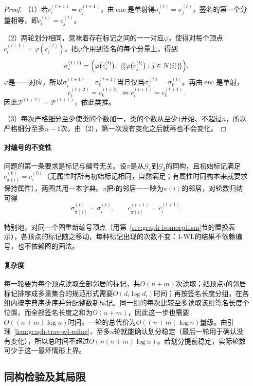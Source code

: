 \begin{proof}
（1）若$c_i^{(t+1)}=c_j^{(t+1)}$，由$\operatorname{enc}$是单射得$\sigma_i^{(t)}=\sigma_j^{(t)}$，签名的第一个分量相等，即$c_i^{(t)}=c_j^{(t)}$。

（2）两轮划分相同，意味着存在标记之间的一一对应$\varphi$，使得对每个顶点$c_i^{(t+1)}=\varphi(c_i^{(t)})$。把$\varphi$作用到签名的每个分量上，得到
\[
\sigma_i^{(t+1)}=\Bigl(\varphi\bigl(c_i^{(t)}\bigr),\ \{\!\{\varphi\bigl(c_j^{(t)}\bigr):j\in N(i)\}\!\}\Bigr).
\]
$\varphi$是一一对应，所以$\sigma_i^{(t+1)}=\sigma_k^{(t+1)}$当且仅当$\sigma_i^{(t)}=\sigma_k^{(t)}$。再由$\operatorname{enc}$是单射，
\[
c_i^{(t+2)}=c_k^{(t+2)}\iff c_i^{(t+1)}=c_k^{(t+1)}.
\]
因此$\mathcal P^{(t+2)}=\mathcal P^{(t+1)}$，依此类推。

（3）每次严格细分至少使类的个数加一，类的个数从至少$1$开始、不超过$n$，所以严格细分至多$n-1$次。由（2），第一次没有变化之后就再也不会变化。
\end{proof}

\paragraph{对编号的不变性}
问题的第一条要求是标记与编号无关。设$\pi$是从$\mathcal G_1$到$\mathcal G_2$的同构，且初始标记满足$c_{\pi(i)}^{(0)}=c_i^{(0)}$（无属性时所有初始标记相同，自然满足；有属性时同构本来就要求保持属性），两图共用一本字典。$\pi$把$i$的邻居一一映为$\pi(i)$的邻居，对轮数归纳可得
\[
\sigma_{\pi(i)}^{(t)}=\sigma_i^{(t)},\qquad
c_{\pi(i)}^{(t+1)}=c_i^{(t+1)}.
\]

特别地，对同一个图重新编号顶点（用第~\ref{sec:graph-isomorphism}节的置换表示），各顶点的标记随之移动，每种标记出现的次数不变：1-WL的结果不依赖编号，也不依赖图的画法。

\paragraph{复杂度}
每一轮要为每个顶点读取全部邻居的标记，共$O(n+m)$次读取；把顶点$i$的邻居标记排序成多重集合的规范形式需要$O(d_i\log d_i)$时间；再按签名长度分组，在各组内按字典序排序并分配整数新标记。同一组的每次比较至多读取该组签名长度个位置，而全部签名长度之和为$O(n+m)$，因此这一步也需要$O((n+m)\log n)$时间。一轮的总代价为$O((n+m)\log n)$量级。由引理~\ref{lem:graph-trav-wl-refine}，至多$n$轮就能确认划分稳定（最后一轮用于确认没有变化），所以总时间不超过$O(n(n+m)\log n)$。若划分提前稳定，实际轮数可少于这一最坏情形上界。

\subsection{同构检验及其局限}
\label{sec:graph-trav-wl-power}

